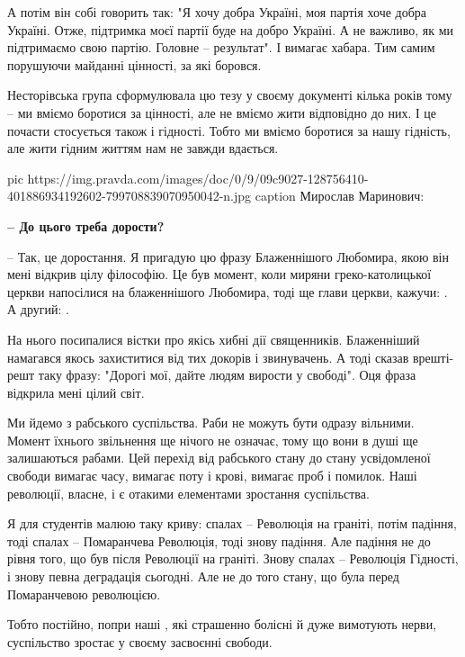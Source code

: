 А потім він собі говорить так: "Я хочу добра Україні, моя партія хоче добра
Україні. Отже, підтримка моєї партії буде на добро Україні. А не важливо, як ми
підтримаємо свою партію. Головне – результат". І вимагає хабара. Тим самим
порушуючи майданні цінності, за які боровся.

Несторівська група сформулювала цю тезу у своєму документі кілька років тому –
ми вміємо боротися за цінності, але не вміємо жити відповідно до них. І це
почасти стосується також і гідності. Тобто ми вміємо боротися за нашу гідність,
але жити гідним життям нам не завжди вдається.

\ifcmt
pic https://img.pravda.com/images/doc/0/9/09c9027-128756410-401886934192602-799708839070950042-n.jpg
caption Мирослав Маринович: 
\fi

{\bfseries 
– До цього треба дорости?
}

– Так, це доростання. Я пригадую цю фразу Блаженнішого Любомира, якою він мені
відкрив цілу філософію. Це був момент, коли миряни греко-католицької церкви
напосілися на блаженнішого Любомира, тоді ще глави церкви, кажучи: . 
А другий: .

На нього посипалися вістки про якісь хибні дії священників. Блаженніший
намагався якось захиститися від тих докорів і звинувачень. А тоді сказав
врешті-решт таку фразу: "Дорогі мої, дайте людям вирости у свободі". Оця фраза
відкрила мені цілий світ. 

Ми йдемо з рабського суспільства. Раби не можуть бути одразу вільними. Момент
їхнього звільнення ще нічого не означає, тому що вони в душі ще залишаються
рабами. Цей перехід від рабського стану до стану усвідомленої свободи вимагає
часу, вимагає поту і крові, вимагає проб і помилок. Наші революції, власне, і є
отакими елементами зростання суспільства.

Я для студентів малюю таку криву: спалах – Революція на граніті, потім падіння,
тоді спалах – Помаранчева Революція, тоді знову падіння. Але падіння не до
рівня того, що був після Революції на граніті. Знову спалах – Революція
Гідності, і знову певна деградація сьогодні. Але не до того стану, що була
перед Помаранчевою революцією. 

Тобто постійно, попри наші , які страшенно болісні й дуже
вимотують нерви, суспільство зростає у своєму засвоєнні свободи.

